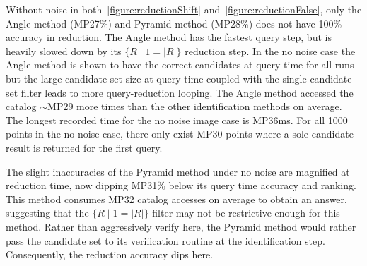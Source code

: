 \begin{figure}
\end{figure}

Without noise in both~\autoref{figure:reductionShift} and~\autoref{figure:reductionFalse}, only the Angle method
(MP27\%) and Pyramid method (MP28\%) does not have 100\% accuracy in reduction.
The Angle method has the fastest query step, but is heavily slowed down by its $\{ R \mid 1 = |R|\}$ reduction step.
In the no noise case the Angle method is shown to have the correct candidates at query time for all runs- but
the large candidate set size at query time coupled with the single candidate set filter leads to more query-reduction
looping.
The Angle method accessed the catalog $\sim$MP29 more times than the other identification methods on average.
The longest recorded time for the no noise image case is MP36ms.
For all 1000 points in the no noise case, there only exist MP30 points where a sole candidate result is returned for the
first query.

The slight inaccuracies of the Pyramid method under no noise are magnified at reduction time, now dipping MP31\% below
its query time accuracy and ranking.
This method consumes MP32 catalog accesses on average to obtain an answer, suggesting that the $\{ R \mid 1 = |R|\}$
filter may not be restrictive enough for this method.
Rather than aggressively verify here, the Pyramid method would rather pass the candidate set to its verification routine
 at the identification step.
Consequently, the reduction accuracy dips here.

